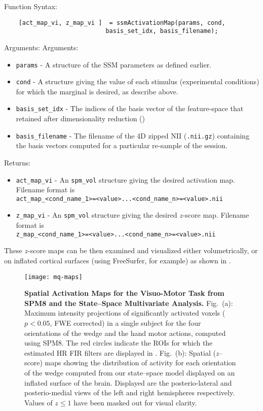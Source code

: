 Function Syntax:
\begin{verbatim}
    [act_map_vi, z_map_vi ]  = ssmActivationMap(params, cond,
                            basis_set_idx, basis_filename);
\end{verbatim}
Arguments: Arguments:
\begin{itemize}
     \item \verb"params" - A structure of the SSM parameters as
      defined earlier.
  \item \verb"cond" - A structure giving the value of each stimulus
  (experimental conditions) for which the
  marginal is desired, as describe above.
    \item \verb"basis_set_idx" -
   The indices of the basis vector of the feature-space that
   retained after dimensionality reduction (\cf {})
  \item \verb"basis_filename" -
    The filename of the 4D zipped NII (\verb".nii.gz")
    containing the basis vectors computed for a particular re-sample of the
    session.
\end{itemize}
Returns:
\begin{itemize}
    \item \verb"act_map_vi" - An \verb"spm_vol" structure giving the
    desired   activation map. Filename format is\\
    \verb"act_map_<cond_name_1>=<value>...<cond_name_n>=<value>.nii"
    \item \verb"z_map_vi" - An \verb"spm_vol" structure giving the
    desired   $z$-score map. Filename format is\\
    \verb"z_map_<cond_name_1>=<value>...<cond_name_n>=<value>.nii"
\end{itemize}
These $z$-score maps can be then examined and visualized either
volumetrically, or on inflated cortical surfaces (using FreeSurfer,
for example) as shown in .


\begin{figure}
\centering
\texttt{[image: mq-maps]}
\caption[Spatial Activation Maps ]{\textbf{Spatial Activation Maps
for the Visuo-Motor Task from SPM8 and the State--Space Multivariate
Analysis.} Fig.~(a): Maximum intensity projections of significantly
activated voxels ($p < 0.05$, FWE corrected) in a single subject for
the four orientations of the wedge and the hand motor actions,
computed using SPM8. The red circles indicate the ROIs for which the
estimated HR FIR filters are displayed in .
Fig.~(b): Spatial ($z$--score) maps showing the distribution of
activity for each orientation of the wedge computed from our
state--space model displayed on an inflated surface of the brain.
Displayed are the posterio-lateral and posterio-medial views of the
left and right hemispheres respectively. Values of $z \leq 1$ have
been masked out for visual clarity. }
 \label{fig:mq-maps}
\end{figure}



